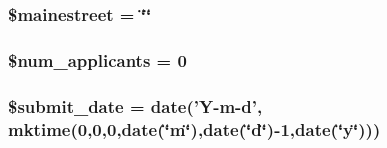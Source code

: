 \hypertarget{cron_8php_a89cda945247d87514ce349c3f383e758}{
\subsubsection[{\$mainestreet}]{\setlength{\rightskip}{0pt plus 5cm}\${\bf mainestreet} = \char`\"{}\char`\"{}}}\label{cron_8php_a89cda945247d87514ce349c3f383e758}
\hypertarget{cron_8php_abd2aef803da83a22fba65c43039802a6}{
\subsubsection[{\$num\-\_\-applicants}]{\setlength{\rightskip}{0pt plus 5cm}\$num\-\_\-applicants = 0}}\label{cron_8php_abd2aef803da83a22fba65c43039802a6}
\hypertarget{cron_8php_a412a6ed3281fda72be261fedfb74c4fc}{
\subsubsection[{\$submit\-\_\-date}]{\setlength{\rightskip}{0pt plus 5cm}\$submit\-\_\-date = date('Y-\/m-\/d', mktime(0,0,0,date(\char`\"{}m\char`\"{}),date(\char`\"{}d\char`\"{})-\/1,date(\char`\"{}y\char`\"{})))}}\label{cron_8php_a412a6ed3281fda72be261fedfb74c4fc}
